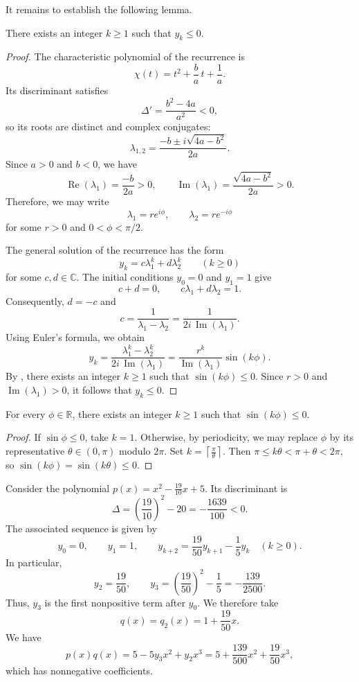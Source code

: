 \documentclass[a4paper,11pt]{article}
\newcommand{\RR}{\mathbb{R}}
\newcommand{\CC}{\mathbb{C}}
\begin{document}
	It remains to establish the following lemma.
	
	\begin{lemma}\label{nonpositive-member}
		There exists an integer $k\geq1$ such that $y_k\leq0$.
	\end{lemma}
	
	
	\begin{proof}
		The characteristic polynomial of the recurrence is
		\[
		\chi(t)=t^2+\frac ba\,t+\frac1a.
		\]
		Its discriminant satisfies
		\[
		\Delta'=\frac{b^2-4a}{a^2}<0,
		\]
		so its roots are distinct and complex conjugates:
		\[
		\lambda_{1,2}
		=\frac{-b\pm i\sqrt{4a-b^2}}{2a}.
		\]
		Since $a>0$ and $b<0$, we have
		\[
		\operatorname{Re}(\lambda_1)=\frac{-b}{2a}>0,
		\qquad
		\operatorname{Im}(\lambda_1)
		=\frac{\sqrt{4a-b^2}}{2a}>0.
		\]
		Therefore, we may write
		\[
		\lambda_1=re^{i\phi},
		\qquad
		\lambda_2=re^{-i\phi}
		\]
		for some $r>0$ and $0<\phi<\pi/2$.
		
		The general solution of the recurrence has the form
		\[
		y_k=c\lambda_1^k+d\lambda_2^k
		\qquad(k\geq0)
		\]
		for some $c,d\in\CC$. The initial conditions $y_0=0$ and $y_1=1$
		give
		\[
		c+d=0,\qquad c\lambda_1+d\lambda_2=1.
		\]
		Consequently, $d=-c$ and
		\[
		c=\frac{1}{\lambda_1-\lambda_2}
		=\frac{1}{2i\,\operatorname{Im}(\lambda_1)}.
		\]
		Using Euler's formula, we obtain
		\[
		y_k
		=\frac{\lambda_1^k-\lambda_2^k}
		{2i\,\operatorname{Im}(\lambda_1)}
		=\frac{r^k}{\operatorname{Im}(\lambda_1)}
		\sin(k\phi).
		\]
		By , there exists an integer $k\geq1$ such that
		$\sin(k\phi)\leq0$. Since $r>0$ and
		$\operatorname{Im}(\lambda_1)>0$, it follows that $y_k\leq0$.
	\end{proof}
	
	\begin{lemma}\label{sin-lemma}
		For every $\phi\in\RR$, there exists an integer $k\geq1$ such that
		$\sin(k\phi)\leq0$.
	\end{lemma}
	
	\begin{proof}
		If $\sin\phi\leq0$, take $k=1$. Otherwise, by periodicity, we may
		replace $\phi$ by its representative $\theta\in(0,\pi)$ modulo
		$2\pi$. Set
		$
		k=\left\lceil\frac{\pi}{\theta}\right\rceil.
		$
		Then
		$
		\pi\leq k\theta<\pi+\theta<2\pi,
		$
		so $\sin(k\phi)=\sin(k\theta)\leq0$.
	\end{proof}
	
	
	\begin{example}
		Consider the polynomial
		$
		p(x)=x^2-\frac{19}{10}x+5.
		$
		Its discriminant is
		\[
		\Delta=\left(\frac{19}{10}\right)^2-20
		=-\frac{1639}{100}<0.
		\]
		The associated sequence is given by
		\[
		y_0=0,\qquad y_1=1,\qquad
		y_{k+2}=\frac{19}{50}y_{k+1}-\frac15y_k
		\quad(k\geq0).
		\]
		In particular,
		\[
		y_2=\frac{19}{50},
		\qquad
		y_3=\left(\frac{19}{50}\right)^2-\frac15
		=-\frac{139}{2500}.
		\]
		Thus, $y_3$ is the first nonpositive term after $y_0$.
		We therefore take
		\[
		q(x)=q_2(x)=1+\frac{19}{50}x.
		\]
		We have
		\[
		p(x)q(x)
		=5-5y_3x^2+y_2x^3
		=5+\frac{139}{500}x^2+\frac{19}{50}x^3,
		\]
		which has nonnegative coefficients.
	\end{example}
	
\end{document}
